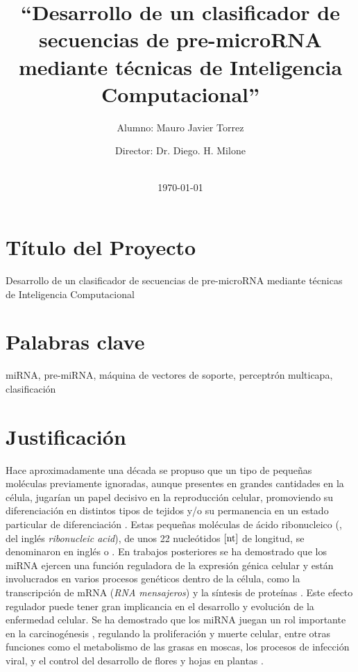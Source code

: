 \documentclass[12pt,bibliography=oldstyle,DIV=14,parskip=full-,titlepage]{scrartcl}
\begin{document}
%
\titlehead{\center\large Universidad Nacional del Litoral\\
  Facultad de Ingeniería y Ciencias Hídricas}
%
\subject{Propuesta de Proyecto Final de Carrera\\Ingeniería en
  Informática}
%
\title{\LARGE ``Desarrollo de un clasificador de secuencias de pre-microRNA
  mediante técnicas de Inteligencia Computacional''}
%
%
\author{{Alumno: Mauro Javier Torrez}\and{Director: Dr. Diego. H. Milone}}
%
\date{\-\\[2em]\today}
\renewcommand*{\titlepagestyle}{empty}
\maketitle
\setcounter{page}{1}
%
%
\section{Título del Proyecto}
Desarrollo de un clasificador de
secuencias de pre-microRNA mediante
técnicas de Inteligencia Computacional
%
%
\section{Palabras clave}
miRNA, pre-miRNA, máquina de vectores
de soporte, perceptrón multicapa, clasificación
%
%
\section{Justificación}
%
%
Hace aproximadamente una década se propuso que un tipo de pequeñas
moléculas previamente ignoradas, aunque presentes en grandes
cantidades en la célula, jugarían un papel decisivo en la reproducción
celular, promoviendo su diferenciación en distintos tipos de tejidos
y/o su permanencia en un estado particular de diferenciación
\cite{lee-mammal}.  Estas pequeñas moléculas de ácido ribonucleico
(, del inglés \emph{ribonucleic acid}), de unos 22
nucleótidos $[\textrm{nt}]$ de longitud, se denominaron en inglés  o
.  En trabajos posteriores se ha demostrado que los miRNA
ejercen una función reguladora de la expresión génica celular
\cite{bartel116} y están involucrados en varios procesos genéticos
dentro de la célula, como la transcripción de mRNA (\emph{RNA
  mensajeros}) y la síntesis de proteínas \cite{lili}.  Este efecto
regulador puede tener gran implicancia en el desarrollo y evolución de
la enfermedad celular. Se ha demostrado que los miRNA juegan un rol
importante en la carcinogénesis \cite{aurora}\cite{lili}, regulando la
proliferación y muerte celular, entre otras funciones como el
metabolismo de las grasas en moscas, los procesos de infección viral,
y el control del desarrollo de flores y hojas en plantas
\cite{bartel116}\cite{lecellier}.
\end{document}
